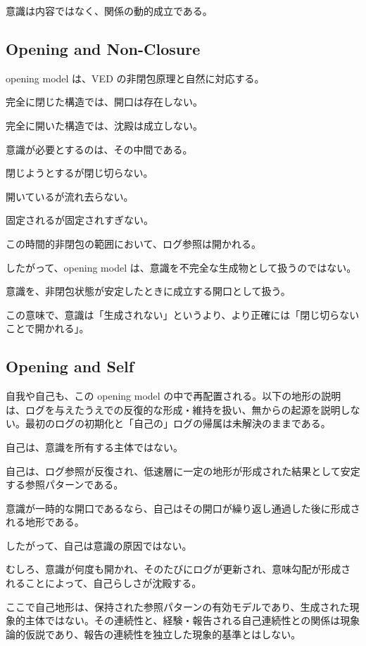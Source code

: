 意識は内容ではなく、関係の動的成立である。

\subsection{Opening and Non-Closure}

opening model は、VED の非閉包原理と自然に対応する。

完全に閉じた構造では、開口は存在しない。

完全に開いた構造では、沈殿は成立しない。

意識が必要とするのは、その中間である。

閉じようとするが閉じ切らない。

開いているが流れ去らない。

固定されるが固定されすぎない。

この時間的非閉包の範囲において、ログ参照は開かれる。

したがって、opening model は、意識を不完全な生成物として扱うのではない。

意識を、非閉包状態が安定したときに成立する開口として扱う。

この意味で、意識は「生成されない」というより、より正確には「閉じ切らないことで開かれる」。

\subsection{Opening and Self}

自我や自己も、この opening model の中で再配置される。以下の地形の説明は、ログを与えたうえでの反復的な形成・維持を扱い、無からの起源を説明しない。最初のログの初期化と「自己の」ログの帰属は未解決のままである。

自己は、意識を所有する主体ではない。

自己は、ログ参照が反復され、低速層に一定の地形が形成された結果として安定する参照パターンである。

意識が一時的な開口であるなら、自己はその開口が繰り返し通過した後に形成される地形である。

したがって、自己は意識の原因ではない。

むしろ、意識が何度も開かれ、そのたびにログが更新され、意味勾配が形成されることによって、自己らしさが沈殿する。

ここで自己地形は、保持された参照パターンの有効モデルであり、生成された現象的主体ではない。その連続性と、経験・報告される自己連続性との関係は現象論的仮説であり、報告の連続性を独立した現象的基準とはしない。

